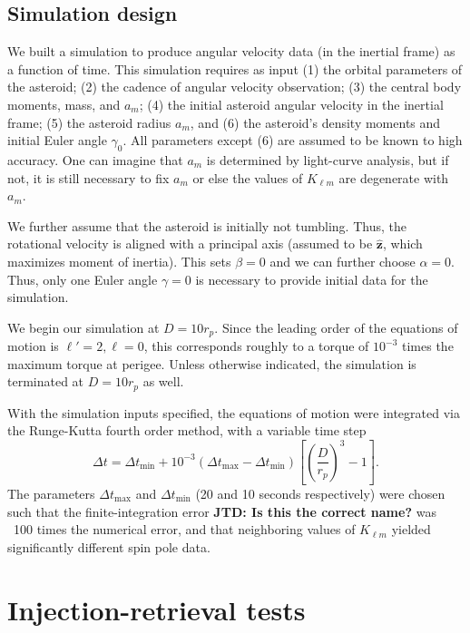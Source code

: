 \documentclass[fleqn,usenatbib]{mnras}
\newcommand{\jtd}[1]{ {\bf{\color{red} JTD: #1}} }
\newcommand{\unit}[1]{\bm{\hat{#1}}}
\newcommand{\parens}[1]{\left( #1 \right)}
\newcommand{\brackets}[1]{\left[ #1 \right]}
\begin{document}
\subsection{Simulation design}
\label{sec:sim}

We built a simulation to produce angular velocity data (in the inertial frame) as a function of time. This simulation requires as input (1) the orbital parameters of the asteroid; (2) the cadence of angular velocity observation; (3) the central body moments, mass, and $a_m$; (4) the initial asteroid angular velocity in the inertial frame; (5) the asteroid radius $a_m$, and (6) the asteroid's density moments and initial Euler angle $\gamma_0$. All parameters except (6) are assumed to be known to high accuracy. One can imagine that $a_m$ is determined by light-curve analysis, but if not, it is still necessary to fix $a_m$ or else the values of $K_{\ell m}$ are degenerate with $a_m$.

We further assume that the asteroid is initially not tumbling. Thus, the rotational velocity is aligned with a principal axis (assumed to be $\unit z$, which maximizes moment of inertia). This sets $\beta = 0$ and we can further choose $\alpha = 0$. Thus, only one Euler angle $\gamma = 0$ is necessary to provide initial data for the simulation.

We begin our simulation at $D = 10 r_p$. Since the leading order of the equations of motion is $\ell' = 2, \ell = 0$, this corresponds roughly to a torque of $10^{-3}$ times the maximum torque at perigee. Unless otherwise indicated, the simulation is terminated at $D=10 r_p$ as well.

With the simulation inputs specified, the equations of motion were integrated via the Runge-Kutta fourth order method, with a variable time step
\begin{equation}
  \Delta t = \Delta t_\text{min} + 10^{-3}(\Delta t_\text{max} - \Delta t_\text{min}) \brackets{\parens{\frac{D}{r_p}}^3 - 1}.
\end{equation}
The parameters $\Delta t_\text{max}$ and $\Delta t_\text{min}$ (20 and 10 seconds respectively) were chosen such that the finite-integration error \jtd{Is this the correct name?} was ~100 times the numerical error, and that neighboring values of $K_{\ell m}$ yielded significantly different spin pole data.





\section{Injection-retrieval tests}
\label{sec:injection-retrieval}
\end{document}
